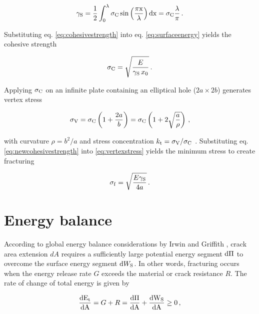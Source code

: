 \documentclass[12pt,twoside]{article}
\begin{document}
\begin{equation}
    \label{eq:surfaceenergy}
    \gamma_{\rm{S}}=\frac{1}{2}\int_{0}^{\lambda}\sigma_{\rm{C}}\,\rm{sin}\left(\frac{\pi x}{\lambda}\right)dx=\sigma_{\rm{C}}\frac{\lambda}{\pi} \,.
\end{equation}

Substituting eq. \ref{eq:cohesivestrength} into eq. \ref{eq:surfaceenergy} yields the cohesive strength \cite{And05}

\begin{equation}
    \label{eq:newcohesivestrength}
    \sigma_{\rm{C}}=\sqrt{\frac{E}{\gamma_{\rm{S}}\,x_{\rm{0}}}}\,.
\end{equation}

Applying $\sigma_{\rm{C}}$ on an infinite plate containing an elliptical hole ($2a \times 2b$) generates vertex stress

\begin{equation}
\label{eq:vertexstress}
    \sigma_{\rm{V}}=\sigma_{\rm{C}}\left(1+\frac{2a}{b}\right)=\sigma_{\rm{C}}\left(1+2\sqrt{\frac{a}{\rho}}\right)\,,
\end{equation}

with curvature $\rho=b^2/a$ and stress concentration $k_{\rm{t}} = \sigma_{\rm{V}} / \sigma_{\rm{C}}$ \cite{And05}. Substituting eq. \ref{eq:newcohesivestrength} into \ref{eq:vertexstress} yields the minimum stress to create fracturing 

\begin{equation}
    \label{eq:FailureStressLocalStress}
    \sigma_{\rm{f}}=\sqrt{\frac{E\gamma_{\rm{S}}}{4a}} \,.
\end{equation}

\section{Energy balance}

According to global energy balance considerations by Irwin and Griffith \cite{Sch12, And05}, crack area extension $dA$ requires a sufficiently large potential energy segment ${\rm{d}}\Pi$ to overcome the surface energy segment ${\rm{d}}W_{\rm{S}}$. In other words, fracturing occurs when the energy release rate $G$ exceeds the material or crack resistance $R$. The rate of change of total energy is given by

\begin{equation}
    \label{eq:EnergyBalance}
    \frac{\rm{d}E_{\rm{t}}}{\rm{d}A}=G+R=\frac{\rm{d}\Pi}{\rm{d}A}+\frac{\rm{d}W_{\rm{S}}}{\rm{d}A}\geq0\,,
\end{equation}
\end{document}

